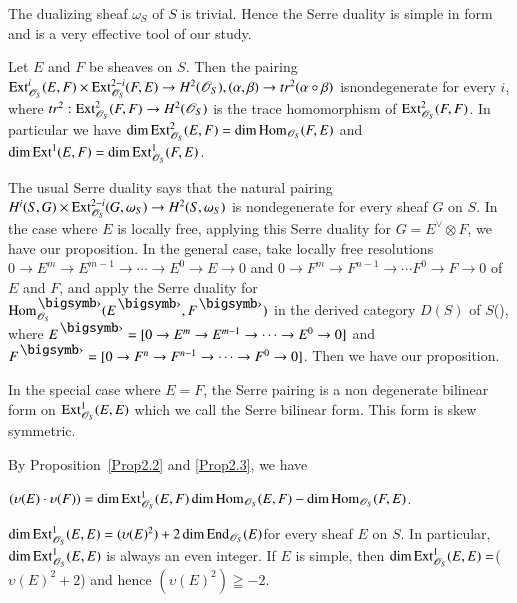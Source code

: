 The dualizing sheaf $\omega_S$ of $S$ is trivial. Hence the Serre
duality is simple in form and is a very effective tool of our study.

\begin{Prop}\label{Prop2.3}
Let $E$ and $F$ be sheaves on $S$. Then the pairing
$\mathrm{Ext}^{i}_{\mathscr{O}_S}\\(E,F)\times
\mathrm{Ext}^{2-i}_{\mathscr{O}_S}(F,E)\to H^{2}(\mathscr{O}_S), (\alpha,
\beta)\to tr^{2}(\alpha \circ \beta)$ is\pageoriginale nondegenerate for every $i$,
where $tr^{2}:\mathrm{Ext}^{2}_{\mathscr{O}_S}(F,F)\to H^{2}(\mathscr{O}_S)$ is the trace
homomorphism of $\mathrm{Ext}^{2}_{\mathscr{O}_S}(F,F)$. In particular we
have $\dim \mathrm{Ext}^{2}_{\mathscr{O}_S}(E,F)=\dim
\mathrm{Hom}_{\mathscr{O}_S}(F,E)$ and $\dim \mathrm{Ext}^{1}(E,F)=\dim
\mathrm{Ext}^{1}_{\mathscr{O}_{S}}(F,E)$. 
\end{Prop}

\begin{Proof}
The usual Serre duality says that the natural pairing
$H^{i}(S,G)\times \mathrm{Ext}_{\mathscr{O}_S}^{2-i}(G,\omega_S)\to
H^{2}(S,\omega_S)$ is nondegenerate for every sheaf $G$ on $S$. In the
case where $E$ is locally free, applying this Serre duality for
$G=E^{\vee}\otimes F$, we have our proposition. In the general case, take
locally free resolutions $0\to E^{m}\to E^{m-1}\to\cdots \to E^{0}\to
E\to0$ and $0\to F^{m}\to F^{n-1}\to\cdots F^{0}\to F\to 0$ of $E$ and
$F$, and apply the Serre duality for $\hom^{\bigdot}_{\mathscr{O}_S}(E^{\bigdot},F^{\bigdot})$ in
the derived category $D(S)$ of $S$(\cite{key3}), where
$E^{\bigdot}=[0\to E^{m}\to E^{m-1}\to \cdots \to E^{0}\to 0]$ and
$F^{\bigdot}=[0\to F^{n}\to F^{n-1}\to\cdots \to F^{0}\to 0]$. Then we
have our proposition.
\enprf
\end{Proof}

In the special case where $E=F$, the Serre pairing is a non degenerate
bilinear form on $\mathrm{Ext}^{1}_{\mathscr{O}_S}(E,E)$ which we call the
Serre bilinear form. This form is skew symmetric.

By Proposition~\ref{Prop2.2} and \ref{Prop2.3}, we have 

\begin{Prop}\label{Prop2.4}
$(\upsilon(E)\cdot\upsilon(F))=\dim \mathrm{Ext}^{1}_{\mathscr{O}_S}(E,F)\dim \mathrm{Hom}_{\mathscr{O}_S}(E,F)-\dim\mathrm{Hom}_{\mathscr{O}_{S}}(F,E)$. 
\end{Prop}

\begin{cor}\label{cor2.5}
$\dim \mathrm{Ext}^{1}_{\mathscr{O}_S}(E,E)=(\upsilon(E)^{2})+2\dim
\mathrm{End}_{\mathscr{O}_S}(E)$\pageoriginale for every sheaf $E$ on $S$. In particular,
$\dim \mathrm{Ext}^{1}_{\mathscr{O}_S}(E,E)$ is always an even integer. If $E$
is simple, then
$\dim \mathrm{Ext}^{1}_{\mathscr{O}_{S}}(E,E)=$($\upsilon(E)^{2}+2$) and hence
$(\upsilon(E)^{2})\geqq -2$.
\end{cor}

